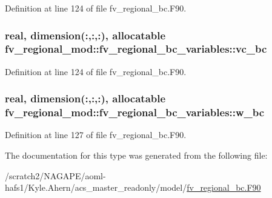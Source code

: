 Definition at line 124 of file fv\-\_\-regional\-\_\-bc.\-F90.

\subsubsection[{vc\-\_\-bc}]{\setlength{\rightskip}{0pt plus 5cm}real, dimension(\-:,\-:,\-:), allocatable fv\-\_\-regional\-\_\-mod\-::fv\-\_\-regional\-\_\-bc\-\_\-variables\-::vc\-\_\-bc\hspace{0.3cm}{\ttfamily [private]}}\label{structfv__regional__mod_1_1fv__regional__bc__variables_ad37018b4fe27728e568418120a8e8f3c}


Definition at line 124 of file fv\-\_\-regional\-\_\-bc.\-F90.

\subsubsection[{w\-\_\-bc}]{\setlength{\rightskip}{0pt plus 5cm}real, dimension(\-:,\-:,\-:), allocatable fv\-\_\-regional\-\_\-mod\-::fv\-\_\-regional\-\_\-bc\-\_\-variables\-::w\-\_\-bc\hspace{0.3cm}{\ttfamily [private]}}\label{structfv__regional__mod_1_1fv__regional__bc__variables_a7aa826c4a7fd43cad4347d66ccd13b64}


Definition at line 127 of file fv\-\_\-regional\-\_\-bc.\-F90.



The documentation for this type was generated from the following file\-:\begin{DoxyCompactItemize}
\item 
/scratch2/\-N\-A\-G\-A\-P\-E/aoml-\/hafs1/\-Kyle.\-Ahern/acs\-\_\-master\-\_\-readonly/model/\hyperlink{fv__regional__bc_8F90}{fv\-\_\-regional\-\_\-bc.\-F90}\end{DoxyCompactItemize}

